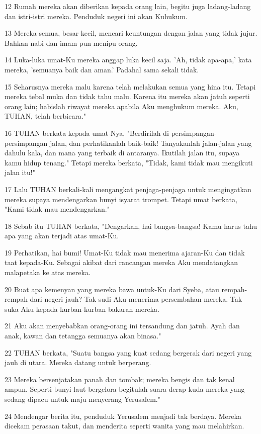 \par 12 Rumah mereka akan diberikan kepada orang lain, begitu juga ladang-ladang dan istri-istri mereka. Penduduk negeri ini akan Kuhukum.
\par 13 Mereka semua, besar kecil, mencari keuntungan dengan jalan yang tidak jujur. Bahkan nabi dan imam pun menipu orang.
\par 14 Luka-luka umat-Ku mereka anggap luka kecil saja. 'Ah, tidak apa-apa,' kata mereka, 'semuanya baik dan aman.' Padahal sama sekali tidak.
\par 15 Seharusnya mereka malu karena telah melakukan semua yang hina itu. Tetapi mereka tebal muka dan tidak tahu malu. Karena itu mereka akan jatuh seperti orang lain; habislah riwayat mereka apabila Aku menghukum mereka. Aku, TUHAN, telah berbicara."
\par 16 TUHAN berkata kepada umat-Nya, "Berdirilah di persimpangan-persimpangan jalan, dan perhatikanlah baik-baik! Tanyakanlah jalan-jalan yang dahulu kala, dan mana yang terbaik di antaranya. Ikutilah jalan itu, supaya kamu hidup tenang." Tetapi mereka berkata, "Tidak, kami tidak mau mengikuti jalan itu!"
\par 17 Lalu TUHAN berkali-kali mengangkat penjaga-penjaga untuk mengingatkan mereka supaya mendengarkan bunyi isyarat trompet. Tetapi umat berkata, "Kami tidak mau mendengarkan."
\par 18 Sebab itu TUHAN berkata, "Dengarkan, hai bangsa-bangsa! Kamu harus tahu apa yang akan terjadi atas umat-Ku.
\par 19 Perhatikan, hai bumi! Umat-Ku tidak mau menerima ajaran-Ku dan tidak taat kepada-Ku. Sebagai akibat dari rancangan mereka Aku mendatangkan malapetaka ke atas mereka.
\par 20 Buat apa kemenyan yang mereka bawa untuk-Ku dari Syeba, atau rempah-rempah dari negeri jauh? Tak sudi Aku menerima persembahan mereka. Tak suka Aku kepada kurban-kurban bakaran mereka.
\par 21 Aku akan menyebabkan orang-orang ini tersandung dan jatuh. Ayah dan anak, kawan dan tetangga semuanya akan binasa."
\par 22 TUHAN berkata, "Suatu bangsa yang kuat sedang bergerak dari negeri yang jauh di utara. Mereka datang untuk berperang.
\par 23 Mereka bersenjatakan panah dan tombak; mereka bengis dan tak kenal ampun. Seperti bunyi laut bergelora begitulah suara derap kuda mereka yang sedang dipacu untuk maju menyerang Yerusalem."
\par 24 Mendengar berita itu, penduduk Yerusalem menjadi tak berdaya. Mereka dicekam perasaan takut, dan menderita seperti wanita yang mau melahirkan.
